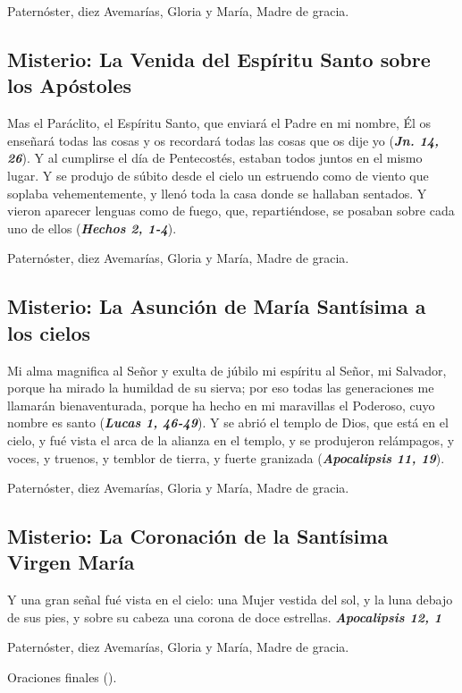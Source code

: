\documentclass[./rosary.tex]{subfiles}
\newcounter{glorious-counter}
\begin{document}
\begin{center}
      Paternóster, diez Avemarías, Gloria y María, Madre de gracia.
\end{center}

\subsection*{ Misterio: La Venida del Espíritu Santo sobre los Apóstoles}

Mas el Paráclito, el Espíritu Santo, que enviará el Padre en mi nombre, Él os enseñará todas las cosas y os recordará todas las cosas que os dije yo (\textbf{\emph{Jn. 14, 26}}). 
Y al cumplirse el día de Pentecostés, estaban todos juntos en el mismo lugar. Y se produjo de súbito desde el cielo un estruendo como de viento que soplaba vehementemente, 
y llenó toda la casa donde se hallaban sentados. Y vieron aparecer lenguas como de fuego, que, repartiéndose, se posaban sobre cada uno de ellos (\textbf{\emph{Hechos 2, 1-4}}).

\begin{center}
      Paternóster, diez Avemarías, Gloria y María, Madre de gracia.
\end{center}

\subsection*{ Misterio: La Asunción de María Santísima a los cielos}

Mi alma magnifica al Señor y exulta de júbilo mi espíritu al Señor, mi Salvador, porque ha mirado la humildad de su sierva; por eso todas las generaciones
me llamarán bienaventurada, porque ha hecho en mi maravillas el Poderoso, cuyo nombre es santo (\textbf{\emph{Lucas 1, 46-49}}).  Y se abrió el templo de Dios, que está en el cielo, y 
fué vista el arca de la alianza en el templo, y se produjeron relámpagos, y voces, y truenos, y temblor de tierra, y fuerte granizada (\textbf{\emph{Apocalipsis 11, 19}}).

\begin{center}
      Paternóster, diez Avemarías, Gloria y María, Madre de gracia.
\end{center}

\subsection*{ Misterio: La Coronación de la Santísima Virgen María}

Y una gran señal fué vista en el cielo: una Mujer vestida del sol, y la luna debajo de sus pies, y sobre su cabeza una corona de doce estrellas. 
\textbf{\emph{Apocalipsis 12, 1}}

\begin{center}
      Paternóster, diez Avemarías, Gloria y María, Madre de gracia.

      Oraciones finales ().
\end{center}
\end{document}

